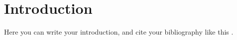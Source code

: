 %
%
%



\chapter*{Introduction}
Here you can write your introduction, and cite your bibliography like this \cite{lowry_protein_1951}.